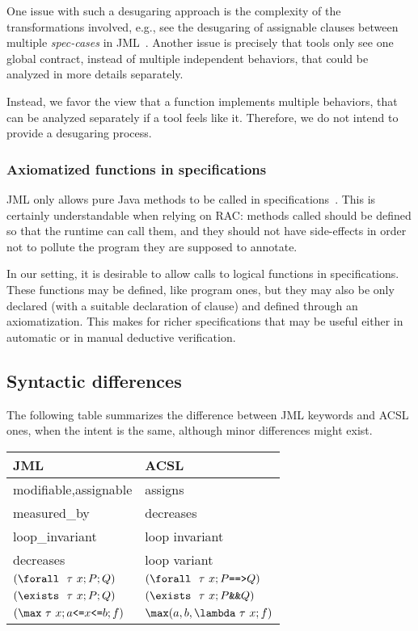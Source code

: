 One issue with such a desugaring approach is the complexity of the
transformations involved, e.g., see the desugaring of assignable clauses
between multiple \textit{spec-cases} in
JML~\cite{raghavan00desugaring}.  Another issue is precisely that
tools only see one global contract, instead of multiple independent
behaviors, that could be analyzed in more details separately.

Instead, we favor the view that a function implements multiple
behaviors, that can be analyzed separately if a tool feels like
it. Therefore, we do not intend to provide a desugaring process.

\subsubsection*{Axiomatized functions in specifications}

JML only allows pure Java methods to be called in
specifications~\cite{leavens00preliminary}. This is certainly
understandable when relying on RAC: methods called should be defined
so that the runtime can call them, and they should not have
side-effects in order not to pollute the program they are supposed to
annotate. 

In our setting, it is desirable to allow calls to logical functions in
specifications. These functions may be defined, like program ones, but
they may also be only declared (with a suitable declaration of \reads
clause) and defined through an axiomatization. 
This makes for richer specifications that may be useful either in
automatic or in manual deductive verification.

\subsection{Syntactic differences}

The following table summarizes the difference between JML keywords and
ACSL ones, when the intent is the same, although minor differences
might exist.

\begin{center}
\begin{tabular}{|l|l|}
\hline
  JML                  & ACSL \\ \hline
  modifiable,assignable           & assigns \\
  measured\_by         & decreases \\
  loop\_invariant      & loop invariant \\
  decreases            & loop variant \\
  $(\texttt{{\textbackslash}forall}~~\tau~x ; P ; Q)$ &   $(\Forall~\tau~x ; P \verb|==>| Q)$ \\
  $(\texttt{{\textbackslash}exists}~~\tau~x ; P ; Q)$ &   $(\Exists~\tau~x ; P \verb|&&| Q)$ \\
  $(\verb|\max|~\tau~x ; a \verb|<=| x \verb|<=| b ; f)$ &   
  $\verb|\max|(a,b,\verb|\lambda|~\tau~x ; f)$ \\
  \hline
\end{tabular}
\end{center}




